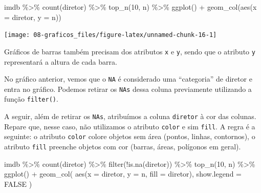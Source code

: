 \documentclass[
]{book}
\newenvironment{Shaded}{\begin{snugshade}}{\end{snugshade}}
\newcommand{\AttributeTok}[1]{\textcolor[rgb]{0.77,0.63,0.00}{#1}}
\newcommand{\ConstantTok}[1]{\textcolor[rgb]{0.00,0.00,0.00}{#1}}
\newcommand{\DecValTok}[1]{\textcolor[rgb]{0.00,0.00,0.81}{#1}}
\newcommand{\FunctionTok}[1]{\textcolor[rgb]{0.00,0.00,0.00}{#1}}
\newcommand{\NormalTok}[1]{#1}
\newcommand{\SpecialCharTok}[1]{\textcolor[rgb]{0.00,0.00,0.00}{#1}}
\begin{document}
\begin{Shaded}
\begin{Highlighting}[]
\NormalTok{imdb }\SpecialCharTok{\%\textgreater{}\%} 
  \FunctionTok{count}\NormalTok{(diretor) }\SpecialCharTok{\%\textgreater{}\%}
  \FunctionTok{top\_n}\NormalTok{(}\DecValTok{10}\NormalTok{, n) }\SpecialCharTok{\%\textgreater{}\%}
  \FunctionTok{ggplot}\NormalTok{() }\SpecialCharTok{+}
  \FunctionTok{geom\_col}\NormalTok{(}\FunctionTok{aes}\NormalTok{(}\AttributeTok{x =}\NormalTok{ diretor, }\AttributeTok{y =}\NormalTok{ n))}
\end{Highlighting}
\end{Shaded}

\begin{center}\texttt{[image: 08-graficos\_files/figure-latex/unnamed-chunk-16-1]} \end{center}

Gráficos de barras também precisam dos atributos \texttt{x} e \texttt{y}, sendo que o atributo \texttt{y} representará a altura de cada barra.

No gráfico anterior, vemos que o \texttt{NA} é considerado uma ``categoria'' de diretor e entra no gráfico. Podemos retirar os \texttt{NAs} dessa coluna previamente utilizando a função \texttt{filter()}.

A seguir, além de retirar os \texttt{NAs}, atribuímos a coluna \texttt{diretor} à cor das colunas. Repare que, nesse caso, não utilizamos o atributo \texttt{color} e sim \texttt{fill}. A regra é a seguinte: o atributo \texttt{color} colore objetos sem área (pontos, linhas, contornos), o atributo \texttt{fill} preenche objetos com cor (barras, áreas, polígonos em geral).

\begin{Shaded}
\begin{Highlighting}[]
\NormalTok{imdb }\SpecialCharTok{\%\textgreater{}\%} 
  \FunctionTok{count}\NormalTok{(diretor) }\SpecialCharTok{\%\textgreater{}\%}
  \FunctionTok{filter}\NormalTok{(}\SpecialCharTok{!}\FunctionTok{is.na}\NormalTok{(diretor)) }\SpecialCharTok{\%\textgreater{}\%} 
  \FunctionTok{top\_n}\NormalTok{(}\DecValTok{10}\NormalTok{, n) }\SpecialCharTok{\%\textgreater{}\%}
  \FunctionTok{ggplot}\NormalTok{() }\SpecialCharTok{+}
  \FunctionTok{geom\_col}\NormalTok{(}
    \FunctionTok{aes}\NormalTok{(}\AttributeTok{x =}\NormalTok{ diretor, }\AttributeTok{y =}\NormalTok{ n, }\AttributeTok{fill =}\NormalTok{ diretor),}
    \AttributeTok{show.legend =} \ConstantTok{FALSE}
\NormalTok{  )}
\end{Highlighting}
\end{Shaded}
\end{document}
